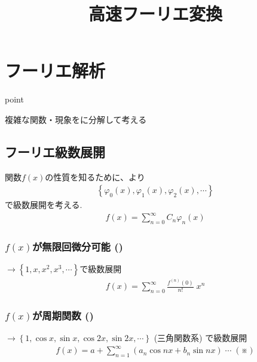 \documentclass[a4paper]{jsarticle}
\author{}
\title{高速フーリエ変換}
\date{}
\begin{document}
\maketitle
\section{フーリエ解析}
\begin{itembox}[l]{point}
    \begin{center}
        複雑な関数・現象をに分解して考える
    \end{center}
\end{itembox}
\subsection{フーリエ級数展開}
関数$f\left(x\right)$の性質を知るために、より
\begin{eqnarray*}
    \left\{\varphi_0\left(x\right),\varphi_1\left(x\right),\varphi_2\left(x\right),\cdots\right\}
\end{eqnarray*}
で級数展開を考える.
\begin{eqnarray*}
    f\left(x\right)=\sum^\infty_{n=0}C_n\varphi_n\left(x\right)
\end{eqnarray*}
\subsubsection*{$f\left(x\right)$が無限回微分可能 ()}
$\rightarrow\left\{1,x,x^2,x^3,\cdots\right\}$で級数展開
\begin{eqnarray*}
    f\left(x\right) = \sum^\infty_{n=0}\frac{f^{\left(n\right)}\left(0\right)}{n!}\;x^n
\end{eqnarray*}
\subsubsection*{$f\left(x\right)$が周期関数 ()}
$\rightarrow\left\{1,\cos x,\sin x,\cos 2x, \sin 2x,\cdots\right\}$ (三角関数系) で級数展開
\begin{eqnarray*}
    f\left(x\right) = a + \sum^\infty_{n=1}\left(a_n \cos nx+b_n \sin nx\right)\;\cdots\; \left(※\right)
\end{eqnarray*}
\end{document}
